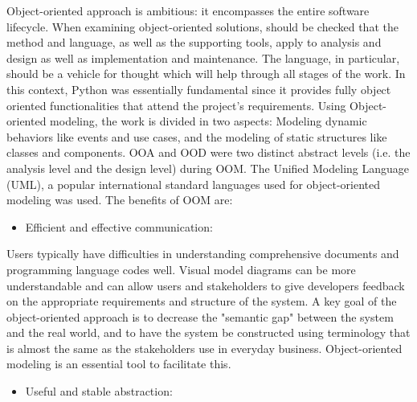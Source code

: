 \documentclass{acm_proc_article-sp}
\begin{document}
\newline
\newline
Object-oriented approach is ambitious: it encompasses the entire software lifecycle. When examining object-oriented solutions, should be checked that the method and language, as well as the supporting tools, apply to analysis and design as well as implementation and maintenance. The language, in particular, should be a vehicle for thought which will help through all stages of the work. In this context, Python was essentially fundamental since it provides fully object oriented functionalities that attend the project's requirements. 
\newline
\newline
Using Object-oriented modeling, the work is divided in two aspects: Modeling dynamic behaviors like events and use cases, and the modeling of static structures like classes and components. OOA and OOD were two distinct abstract levels (i.e. the analysis level and the design level) during OOM. The Unified Modeling Language (UML), a popular international standard languages used for object-oriented modeling was used. The benefits of OOM are:

\begin{itemize}
\item Efficient and effective communication:
\end{itemize}

Users typically have difficulties in understanding comprehensive documents and programming language codes well. Visual model diagrams can be more understandable and can allow users and stakeholders to give developers feedback on the appropriate requirements and structure of the system. A key goal of the object-oriented approach is to decrease the "semantic gap" between the system and the real world, and to have the system be constructed using terminology that is almost the same as the stakeholders use in everyday business. Object-oriented modeling is an essential tool to facilitate this.
\newline
\newline
\begin{itemize}
\item Useful and stable abstraction:
\end{itemize}
\end{document}
